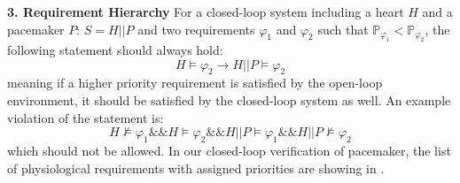 \noindent
\textbf{3. Requirement Hierarchy}
For a closed-loop system including a heart $H$ and a pacemaker $P$: $S=H || P$ and two requirements $\varphi_1$ and $\varphi_2$ such that $\mathbb{P}_{\varphi_1}<\mathbb{P}_{\varphi_2}$, the following statement should always hold:
\vspace{-5pt}
$$H\models\varphi_2\rightarrow H||P\models\varphi_2$$
\noindent
meaning if a higher priority requirement is satisfied by the open-loop environment, it should be satisfied by the closed-loop system as well. An example violation of the statement is:
$$H\not\models\varphi_1 \&\& H\models\varphi_2 \&\& H||P\models\varphi_1 \&\& H||P\not\models\varphi_2$$
\noindent
which should not be allowed. In our closed-loop verification of pacemaker, the list of physiological requirements with assigned priorities are showing in .





